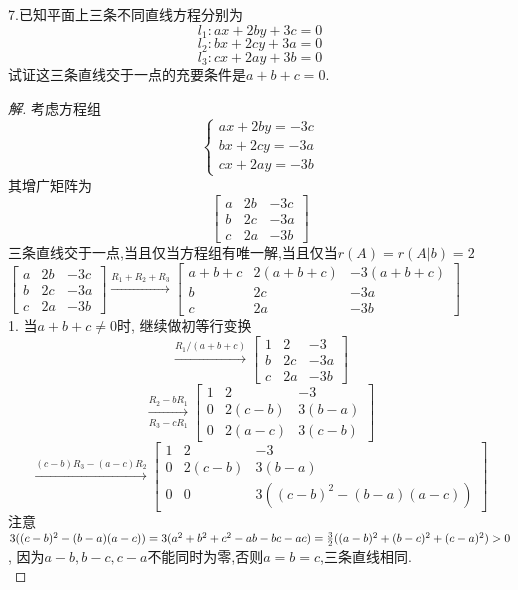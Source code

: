 \documentclass[10pt,a4paper]{report}
\begin{document}
\noindent 7.已知平面上三条不同直线方程分别为
$$
l_{1}:ax+2by+3c=0
$$
$$
l_{2}:bx+2cy+3a=0
$$
$$
l_{3}:cx+2ay+3b=0
$$
试证这三条直线交于一点的充要条件是$a+b+c=0$.
\begin{proof}[解]
	考虑方程组
	$$
	\left\{
	\begin{aligned}
	ax+2by=-3c \\
	bx+2cy=-3a \\
	cx+2ay=-3b
	\end{aligned}
	\right.
	$$
	其增广矩阵为
	$$
	\left[
	\begin{matrix}
	a & 2b & -3c \\
	b & 2c & -3a \\
	c & 2a & -3b 
	\end{matrix}
	\right]
	$$
	三条直线交于一点,当且仅当方程组有唯一解,当且仅当$r(A)=r(A|b)=2$\\
	$
	\left[
	\begin{matrix}
	a & 2b & -3c \\
	b & 2c & -3a \\
	c & 2a & -3b 
	\end{matrix}
	\right] \xrightarrow{R_{1}+R_{2}+R_{3}}
	\left[
	\begin{matrix}
	a+b+c & 2(a+b+c) & -3(a+b+c) \\
	b & 2c & -3a \\
	c & 2a & -3b 
	\end{matrix}
	\right]
	$\\
	1. 当$a+b+c \neq 0$时, 继续做初等行变换
	$$
	\xrightarrow{R_{1}/(a+b+c)} 
	\left[
	\begin{matrix}
	1 & 2 & -3 \\
	b & 2c & -3a \\
	c & 2a & -3b 
	\end{matrix}
	\right]
	$$
	$$
	\xrightarrow[R_{3}-cR_{1}]{R_{2}-bR_{1}}
	\left[
	\begin{matrix}
	1 & 2 & -3 \\
	0 & 2(c-b) & 3(b-a) \\
	0 & 2(a-c) & 3(c-b)
	\end{matrix}
	\right]
	$$
	$$
	\xrightarrow{(c-b)R_{3}-(a-c)R_{2}}
	\left[
	\begin{matrix}
	1 & 2 & -3 \\
	0 & 2(c-b) & 3(b-a) \\
	0 & 0 & 3((c-b)^{2}-(b-a)(a-c))
	\end{matrix}
	\right]
	$$
	注意$3((c-b)^{2}-(b-a)(a-c)) = 3(a^{2}+b^{2}+c^{2}-ab-bc-ac)\\
	=\frac{3}{2}((a-b)^{2}+(b-c)^{2}+(c-a)^{2}) > 0$, 因为$a-b,b-c,c-a$不能同时为零,否则$a=b=c$,三条直线相同.\\

\end{proof}
\end{document}
